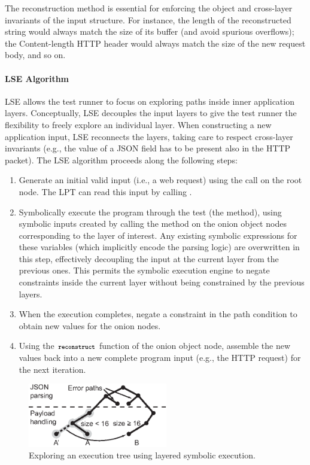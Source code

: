 The reconstruction method is essential for enforcing the object and cross-layer invariants of the input structure.  For instance, the length of the reconstructed string would always match the size of its buffer (and avoid spurious overflows); the Content-length HTTP header would always match the size of the new request body, and so on.

\paragraph{LSE Algorithm}

LSE allows the test runner to focus on exploring paths inside inner application layers. Conceptually, LSE decouples the input layers to give the test runner the flexibility to freely explore an individual layer. When constructing a new application input, LSE reconnects the layers, taking care to respect cross-layer invariants (e.g., the value of a JSON field has to be present also in the HTTP packet).
%
The LSE algorithm proceeds along the following steps:
\begin{enumerate}
\item Generate an initial valid input (i.e., a web request) using the
   call on the root node.  The LPT can read this
  input by calling .
%
\item Symbolically execute the program through the test (the
   method), using symbolic inputs created by calling
  the  method on the onion object nodes
  corresponding to the layer of interest.  
%
  Any existing symbolic expressions for these variables (which
  implicitly encode the parsing logic) are overwritten in this step,
  effectively decoupling the input at the current layer from the
  previous ones.  This permits the symbolic execution engine to negate
  constraints inside the current layer without being constrained
  by the previous layers.
%
\item When the execution completes, negate a constraint in the path
  condition to obtain new values for the onion nodes.
%
\item Using the $\texttt{\footnotesize \bfseries reconstruct}$ function of the onion object
  node, assemble the new values back into a new complete program input
  (e.g., the HTTP request) for the next iteration.
\end{enumerate}

\begin{figure}
  \centering
  \includegraphics[width=2.4in]{figures/paas/layered-tree}
  \caption{Exploring an execution tree using layered symbolic
    execution.}
  \label{fig:layered-tree}
\end{figure}

